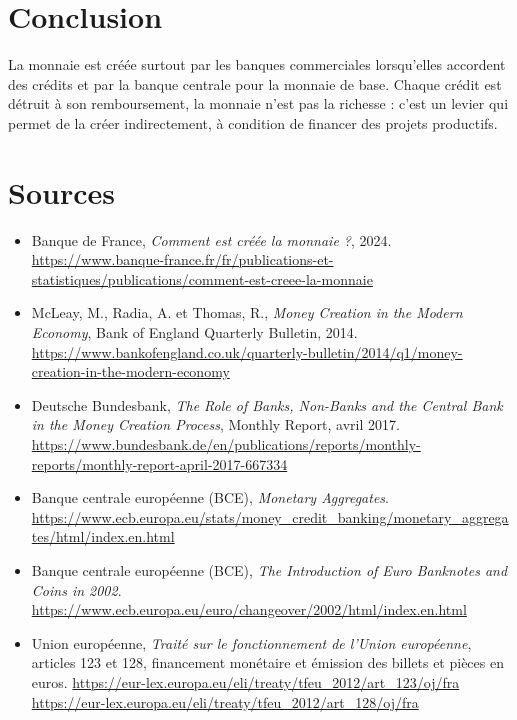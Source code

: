 \documentclass[11pt,a4paper]{article}
\begin{document}
\section*{Conclusion}

La monnaie est créée surtout par les banques commerciales lorsqu'elles accordent des crédits et par la banque centrale pour la monnaie de base. Chaque crédit est détruit à son remboursement, la monnaie n'est pas la richesse : c'est un levier qui permet de la créer indirectement, à condition de financer des projets productifs. 

\section*{Sources}

\begin{itemize}

    \item Banque de France, \textit{Comment est créée la monnaie ?}, 2024.
    \url{https://www.banque-france.fr/fr/publications-et-statistiques/publications/comment-est-creee-la-monnaie}

    \item McLeay, M., Radia, A. et Thomas, R., \textit{Money Creation in the Modern Economy}, Bank of England Quarterly Bulletin, 2014.
    \url{https://www.bankofengland.co.uk/quarterly-bulletin/2014/q1/money-creation-in-the-modern-economy}

    \item Deutsche Bundesbank, \textit{The Role of Banks, Non-Banks and the Central Bank in the Money Creation Process}, Monthly Report, avril 2017.
    \url{https://www.bundesbank.de/en/publications/reports/monthly-reports/monthly-report-april-2017-667334}

    \item Banque centrale européenne (BCE), \textit{Monetary Aggregates}.
    \url{https://www.ecb.europa.eu/stats/money_credit_banking/monetary_aggregates/html/index.en.html}

    \item Banque centrale européenne (BCE), \textit{The Introduction of Euro Banknotes and Coins in 2002}.
    \url{https://www.ecb.europa.eu/euro/changeover/2002/html/index.en.html}

    \item Union européenne, \textit{Traité sur le fonctionnement de l'Union européenne}, articles 123 et 128, financement monétaire et émission des billets et pièces en euros.
    \url{https://eur-lex.europa.eu/eli/treaty/tfeu_2012/art_123/oj/fra}
    \url{https://eur-lex.europa.eu/eli/treaty/tfeu_2012/art_128/oj/fra}

\end{itemize}
\end{document}
